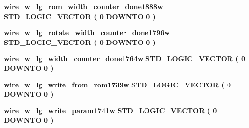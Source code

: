 \begin{DoxyCompactItemize}
\item 
{\bf wire\+\_\+w\+\_\+lg\+\_\+rom\+\_\+width\+\_\+counter\+\_\+done1888w} {\bfseries \textcolor{comment}{S\+T\+D\+\_\+\+L\+O\+G\+I\+C\+\_\+\+V\+E\+C\+T\+OR}\textcolor{vhdlchar}{ }\textcolor{vhdlchar}{(}\textcolor{vhdlchar}{ }\textcolor{vhdlchar}{ } \textcolor{vhdldigit}{0} \textcolor{vhdlchar}{ }\textcolor{keywordflow}{D\+O\+W\+N\+TO}\textcolor{vhdlchar}{ }\textcolor{vhdlchar}{ } \textcolor{vhdldigit}{0} \textcolor{vhdlchar}{ }\textcolor{vhdlchar}{)}\textcolor{vhdlchar}{ }} 
\item 
{\bf wire\+\_\+w\+\_\+lg\+\_\+rotate\+\_\+width\+\_\+counter\+\_\+done1796w} {\bfseries \textcolor{comment}{S\+T\+D\+\_\+\+L\+O\+G\+I\+C\+\_\+\+V\+E\+C\+T\+OR}\textcolor{vhdlchar}{ }\textcolor{vhdlchar}{(}\textcolor{vhdlchar}{ }\textcolor{vhdlchar}{ } \textcolor{vhdldigit}{0} \textcolor{vhdlchar}{ }\textcolor{keywordflow}{D\+O\+W\+N\+TO}\textcolor{vhdlchar}{ }\textcolor{vhdlchar}{ } \textcolor{vhdldigit}{0} \textcolor{vhdlchar}{ }\textcolor{vhdlchar}{)}\textcolor{vhdlchar}{ }} 
\item 
{\bf wire\+\_\+w\+\_\+lg\+\_\+width\+\_\+counter\+\_\+done1764w} {\bfseries \textcolor{comment}{S\+T\+D\+\_\+\+L\+O\+G\+I\+C\+\_\+\+V\+E\+C\+T\+OR}\textcolor{vhdlchar}{ }\textcolor{vhdlchar}{(}\textcolor{vhdlchar}{ }\textcolor{vhdlchar}{ } \textcolor{vhdldigit}{0} \textcolor{vhdlchar}{ }\textcolor{keywordflow}{D\+O\+W\+N\+TO}\textcolor{vhdlchar}{ }\textcolor{vhdlchar}{ } \textcolor{vhdldigit}{0} \textcolor{vhdlchar}{ }\textcolor{vhdlchar}{)}\textcolor{vhdlchar}{ }} 
\item 
{\bf wire\+\_\+w\+\_\+lg\+\_\+write\+\_\+from\+\_\+rom1739w} {\bfseries \textcolor{comment}{S\+T\+D\+\_\+\+L\+O\+G\+I\+C\+\_\+\+V\+E\+C\+T\+OR}\textcolor{vhdlchar}{ }\textcolor{vhdlchar}{(}\textcolor{vhdlchar}{ }\textcolor{vhdlchar}{ } \textcolor{vhdldigit}{0} \textcolor{vhdlchar}{ }\textcolor{keywordflow}{D\+O\+W\+N\+TO}\textcolor{vhdlchar}{ }\textcolor{vhdlchar}{ } \textcolor{vhdldigit}{0} \textcolor{vhdlchar}{ }\textcolor{vhdlchar}{)}\textcolor{vhdlchar}{ }} 
\item 
{\bf wire\+\_\+w\+\_\+lg\+\_\+write\+\_\+param1741w} {\bfseries \textcolor{comment}{S\+T\+D\+\_\+\+L\+O\+G\+I\+C\+\_\+\+V\+E\+C\+T\+OR}\textcolor{vhdlchar}{ }\textcolor{vhdlchar}{(}\textcolor{vhdlchar}{ }\textcolor{vhdlchar}{ } \textcolor{vhdldigit}{0} \textcolor{vhdlchar}{ }\textcolor{keywordflow}{D\+O\+W\+N\+TO}\textcolor{vhdlchar}{ }\textcolor{vhdlchar}{ } \textcolor{vhdldigit}{0} \textcolor{vhdlchar}{ }\textcolor{vhdlchar}{)}\textcolor{vhdlchar}{ }} 
\item 

\end{DoxyCompactItemize}
